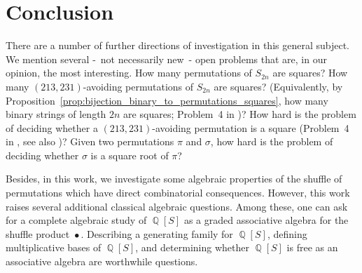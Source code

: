 \documentclass[a4paper]{llncs}
\DeclareMathOperator{\QQ}{\mathbb{Q}}
\DeclareMathOperator{\SHUFFLE}{\bullet}
\begin{document}


\section{Conclusion}
\label{section:Conclusion}

There are a number of further directions of investigation in this
general subject. We mention several -~not necessarily new~- open
problems that are, in our opinion, the most interesting. How many
permutations of $S_{2n}$ are squares? How many $(213,231)$-avoiding
permutations of $S_{2n}$ are squares? (Equivalently, by
Proposition~\ref{prop:bijection_binary_to_permutations_squares},
how many binary strings of length $2n$ are squares; Problem~4
in \cite{Henshall:Rampersad:Shallit:2011})? How hard is the problem of
deciding whether a $(213,231)$-avoiding permutation is a square
(Problem~4 in \cite{Henshall:Rampersad:Shallit:2011},
see also \cite{Buss:Soltys:2014,Rizzi:Vialette:CSR:2013})?
Given two permutations $\pi$ and $\sigma$, how hard is the problem of
deciding whether $\sigma$ is a square root of $\pi$?
\smallskip

Besides, in this work, we investigate some algebraic properties of the
shuffle of permutations which have direct combinatorial consequences.
However, this work raises several additional classical algebraic
questions. Among these, one can ask for a complete algebraic study of
$\QQ[S]$ as a graded associative algebra for the shuffle  product
$\SHUFFLE$. Describing a generating family for $\QQ[S]$, defining
multiplicative bases of $\QQ[S]$, and determining whether $\QQ[S]$ is
free as an associative algebra are worthwhile questions.

\end{document}
